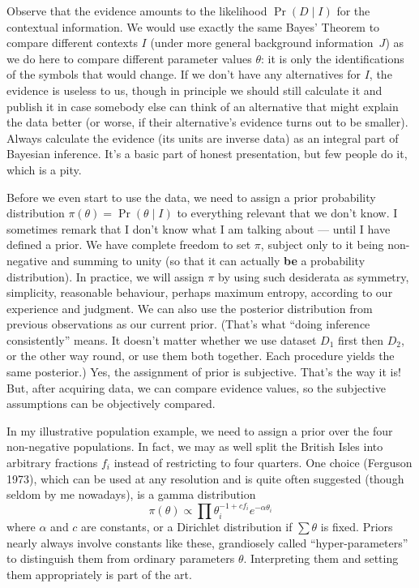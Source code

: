 Observe that the evidence amounts to the likelihood $\Pr(D\mid I)$ for the contextual information.
We would use exactly the same Bayes' Theorem to compare different contexts $I$ (under more general background information~$J$) 
as we do here to compare different parameter values $\theta$: it is only the identifications of the symbols that would change.
If we don't have any alternatives for $I$, the evidence is useless to us, 
though in principle we should still calculate it and publish it in case somebody else can think of an alternative that might explain the data better
(or worse, if their alternative's evidence turns out to be smaller).
Always calculate the evidence (its units are inverse data) as an integral part of Bayesian inference.  
It's a basic part of honest presentation, but few people do it, which is a pity.

\bigskip
{}
\smallskip

Before we even start to use the data, we need to assign a prior probability distribution $\pi(\theta)=\Pr(\theta\mid I)$ to everything relevant that we don't know.
I sometimes remark that I don't know what I am talking about --- until I have defined a prior.  
We have complete freedom to set $\pi$, subject only to it being non-negative and summing to unity (so that it can actually {\bf be} a probability distribution).  
In practice, we will assign $\pi$ by using such desiderata as symmetry, simplicity, reasonable behaviour, perhaps maximum entropy, according to our experience and judgment. 
We can also use the posterior distribution from previous observations as our current prior.
(That's what ``doing inference consistently'' means.  
It doesn't matter whether we use dataset $D_1$ first then $D_2$, or the other way round, or use them both together.  
Each procedure yields the same posterior.)
Yes, the assignment of prior is subjective.  That's the way it is!
But, after acquiring data, we can compare evidence values, so the subjective assumptions can be objectively compared.

In my illustrative population example, we need to assign a prior over the four non-negative populations.  
In fact, we may as well split the British Isles into arbitrary fractions $f_i$ instead of restricting to four quarters.  
One choice (Ferguson 1973), which can be used at any resolution and is quite often suggested (though seldom by me nowadays), is a gamma distribution
$$
  \pi(\theta) \propto \prod \theta_i^{-1 + c f_i} e^{-\alpha \theta_i}
$$
where $\alpha$ and $c$ are constants, or a Dirichlet distribution if $\sum\theta$ is fixed.  
Priors nearly always involve constants like these, grandiosely called ``hyper-parameters'' to distinguish them from ordinary parameters $\theta$. 
Interpreting them and setting them appropriately is part of the art.

